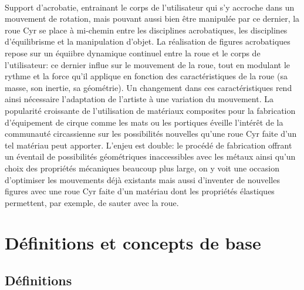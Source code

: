 
\label{sec:Introduction}  %

\\
Support d'acrobatie, entrainant le corps de l'utilisateur qui s'y accroche dans un mouvement de rotation, mais pouvant aussi bien être manipulée par ce dernier, la roue Cyr se place à mi-chemin entre les disciplines acrobatiques, les disciplines d'équilibrisme et la manipulation d'objet. La réalisation de figures acrobatiques repose sur un équiibre dynamique continuel entre la roue et le corps de l'utilisateur: ce dernier influe sur le mouvement de la roue, tout en modulant le rythme et la force qu'il applique en fonction des caractéristiques de la roue (sa masse, son inertie, sa géométrie). Un changement dans ces caractéristiques rend ainsi nécessaire l'adaptation de l'artiste à une variation du mouvement. La popularité croissante de l'utilisation de matériaux composites pour la fabrication d'équipement de cirque comme les mats ou les portiques éveille l'intérêt de la communauté circassienne sur les possibilités nouvelles qu'une roue Cyr faite d'un tel matériau peut apporter. L'enjeu est double: le procédé de fabrication offrant un éventail de possibilités géométriques inaccessibles avec les métaux ainsi qu'un choix des propriétés mécaniques beaucoup plus large, on y voit une occasion d'optimiser les mouvements déjà existants mais aussi d'inventer de nouvelles figures avec une roue Cyr faite d'un matériau dont les propriétés élastiques permettent, par exemple, de sauter avec la roue.
\section{Définitions et concepts de base}  %



\subsection{Définitions}
